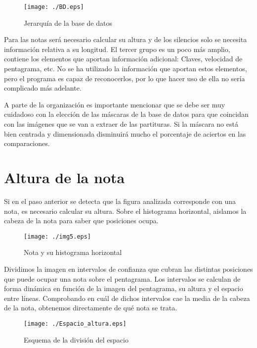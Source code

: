 \documentclass[10pt, a4paper]{article}
\begin{document}
\begin{figure}[h!]
  \centering
    \texttt{[image: ./BD.eps]}
  \caption{Jerarquía de la base de datos}
  \label{fig10}
\end{figure}

Para las notas será necesario calcular su altura y de los silencios solo se necesita información relativa a su longitud. El tercer grupo es un poco más amplio, contiene los elementos que aportan información adicional: Claves, velocidad de pentagrama, etc. No se ha utilizado la información que aportan estos elementos, pero el programa es capaz de reconocerlos, por lo que hacer uso de ella no sería complicado más adelante.

A parte de la organización es importante mencionar que se debe ser muy cuidadoso con la elección de las máscaras de la base de datos para que coincidan con las imágenes que se van a extraer de las partituras. Si la máscara no está bien centrada y dimensionada disminuirá mucho el porcentaje de aciertos en las comparaciones.


\section{Altura de la nota}

Si en el paso anterior se detecta que la figura analizada corresponde con una nota, es necesario calcular su altura. Sobre el histograma horizontal, aislamos la cabeza de la nota para saber que posiciones ocupa.

\begin{figure}[h!]
  \centering
    \texttt{[image: ./img5.eps]}
  \caption{Nota y su histograma horizontal}
  \label{fig1}
\end{figure}


Dividimos la imagen en intervalos de confianza que cubran las distintas posiciones que puede ocupar una nota sobre el pentagrama. Los intervalos se calculan de forma dinámica en función de la imagen del pentagrama, su altura y el espacio entre líneas. Comprobando en cuál de dichos intervalos cae la media de la cabeza de la nota, obtenemos directamente de qué nota se trata.

\begin{figure}[h!]
  \centering
    \texttt{[image: ./Espacio\_altura.eps]}
  \caption{Esquema de la división del espacio}
  \label{fig1}
\end{figure}
\end{document}
